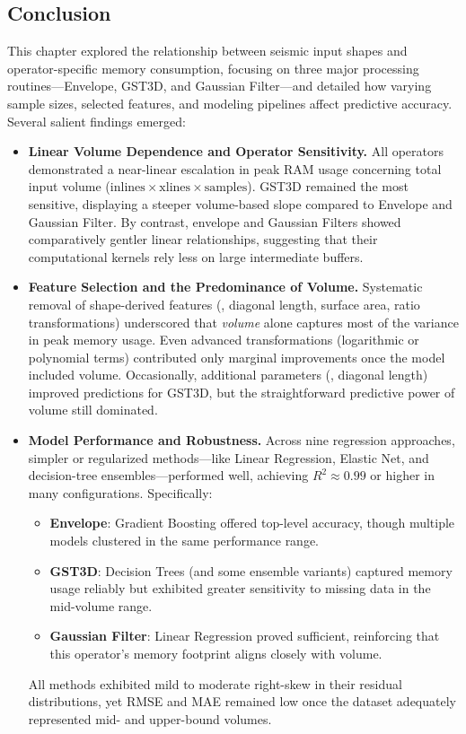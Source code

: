 \subsection{Conclusion}
\label{subsec:pmc-conclusion}

This chapter explored the relationship between seismic input shapes and operator-specific memory consumption, focusing on three major processing routines—Envelope, \ac{GST3D}, and Gaussian Filter—and detailed how varying sample sizes, selected features, and modeling pipelines affect predictive accuracy.
Several salient findings emerged:

\begin{itemize}
    \item \textbf{Linear Volume Dependence and Operator Sensitivity.}
    All operators demonstrated a near-linear escalation in peak \ac{RAM} usage concerning total input volume (\( \text{inlines} \times \text{xlines} \times \text{samples} \)).
    \ac{GST3D} remained the most sensitive, displaying a steeper volume-based slope compared to Envelope and Gaussian Filter.
    By contrast, envelope and Gaussian Filters showed comparatively gentler linear relationships, suggesting that their computational kernels rely less on large intermediate buffers.

    \item \textbf{Feature Selection and the Predominance of Volume.}
    Systematic removal of shape-derived features (\eg, diagonal length, surface area, ratio transformations) underscored that \emph{volume} alone captures most of the variance in peak memory usage.
    Even advanced transformations (logarithmic or polynomial terms) contributed only marginal improvements once the model included volume.
    Occasionally, additional parameters (\eg, diagonal length) improved predictions for \ac{GST3D}, but the straightforward predictive power of volume still dominated.

    \item \textbf{Model Performance and Robustness.}
    Across nine regression approaches, simpler or regularized methods—like Linear Regression, Elastic Net, and decision-tree ensembles—performed well, achieving \(R^2 \approx 0.99\) or higher in many configurations.
    Specifically:
    \begin{itemize}
        \item \textbf{Envelope}: Gradient Boosting offered top-level accuracy, though multiple models clustered in the same performance range.
        \item \textbf{\ac{GST3D}}: Decision Trees (and some ensemble variants) captured memory usage reliably but exhibited greater sensitivity to missing data in the mid-volume range.
        \item \textbf{Gaussian Filter}: Linear Regression proved sufficient, reinforcing that this operator's memory footprint aligns closely with volume.
    \end{itemize}
    All methods exhibited mild to moderate right-skew in their residual distributions, yet \ac{RMSE} and \ac{MAE} remained low once the dataset adequately represented mid- and upper-bound volumes.


\end{itemize}
